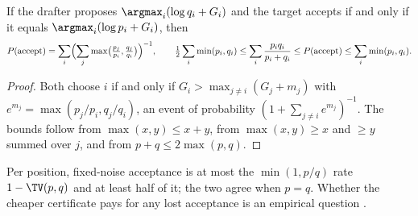 \begin{proposition}\label{prop:coupling}
If the drafter proposes $\argmax_i(\log q_i+G_i)$ and the target accepts if and only if it equals $\argmax_i(\log p_i+G_i)$, then
\[P(\text{accept})=\sum_i\Bigl(\sum_j\max\bigl(\tfrac{p_j}{p_i},\tfrac{q_j}{q_i}\bigr)\Bigr)^{-1},\qquad
\tfrac12\sum_i\min(p_i,q_i)\le\sum_i\frac{p_iq_i}{p_i+q_i}\le P(\text{accept})\le\sum_i\min(p_i,q_i).\]
\end{proposition}
\begin{proof}
Both choose $i$ if and only if $G_i>\max_{j\ne i}(G_j+m_j)$ with $e^{m_j}=\max(p_j/p_i,q_j/q_i)$, an event of probability $(1+\sum_{j\ne i}e^{m_j})^{-1}$. The bounds follow from $\max(x,y)\le x+y$, from $\max(x,y)\ge x$ and $\ge y$ summed over $j$, and from $p+q\le2\max(p,q)$.
\end{proof}
Per position, fixed-noise acceptance is at most the $\min(1,p/q)$ rate $1-\TV(p,q)$ and at least half of it; the two agree when $p=q$. Whether the cheaper certificate pays for any lost acceptance is an empirical question .

